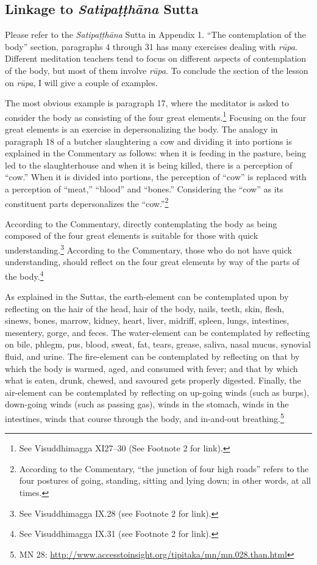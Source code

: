\subsection*{Linkage to \textit{Satipaṭṭhāna} Sutta}

Please refer to the \textit{Satipaṭṭhāna} Sutta in Appendix 1. “The contemplation of the body” section, paragraphs 4 through 31 has many exercises dealing with \textit{rūpa}. Different meditation teachers tend to focus on different aspects of contemplation of the body, but most of them involve \textit{rūpa}. To conclude the section of the lesson on \textit{rūpa}, I will give a couple of examples.

The most obvious example is paragraph 17, where the meditator is asked to consider the body as consisting of the four great elements.\footnote{See Visuddhimagga XI27--30 (See Footnote 2 for link).} Focusing on the four great elements is an exercise in depersonalizing the body. The analogy in paragraph 18 of a butcher slaughtering a cow and dividing it into portions is explained in the Commentary as follows: when it is feeding in the pasture, being led to the slaughterhouse and when it is being killed, there is a perception of “cow.” When it is divided into portions, the perception of “cow” is replaced with a perception of “meat,” “blood” and “bones.” Considering the “cow” as its constituent parts depersonalizes the “cow.”\footnote{According to the Commentary, “the junction of four high roads” refers to the four postures of going, standing, sitting and lying down; in other words, at all times.}

According to the Commentary, directly contemplating the body as being composed of the four great elements is suitable for those with quick understanding.\footnote{See Visuddhimagga IX.28 (see Footnote 2 for link).} According to the Commentary, those who do not have quick understanding, should reflect on the four great elements by way of the parts of the body.\footnote{See Visuddhimagga IX.31 (see Footnote 2 for link).} 

As explained in the Suttas, the earth-element can be contemplated upon by reflecting on the hair of the head, hair of the body, nails, teeth, skin, flesh, sinews, bones, marrow, kidney, heart, liver, midriff, spleen, lungs, intestines, mesentery, gorge, and feces. The water-element can be contemplated by reflecting on bile, phlegm, pus, blood, sweat, fat, tears, grease, saliva, nasal mucus, synovial fluid, and urine. The fire-element can be contemplated by reflecting on that by which the body is warmed, aged, and consumed with fever; and that by which what is eaten, drunk, chewed, and savoured gets properly digested. Finally, the air-element can be contemplated by reflecting on up-going winds (such as burps), down-going winds (such as passing gas), winds in the stomach, winds in the intestines, winds that course through the body, and in-and-out breathing.\footnote{MN 28: \url{http://www.accesstoinsight.org/tipitaka/mn/mn.028.than.html}}

